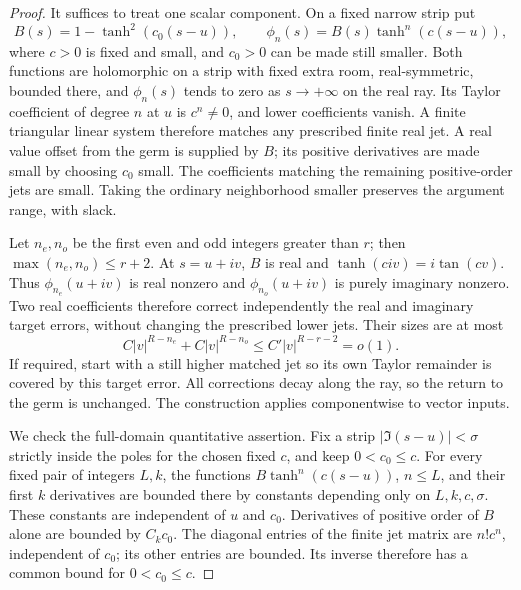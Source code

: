 \begin{proof}
It suffices to treat one scalar component.  On a fixed narrow strip put
\[
 B(s)=1-\tanh^2(c_0(s-u)),\qquad
 \phi_n(s)=B(s)\tanh^n(c(s-u)),
\]
where $c>0$ is fixed and small, and $c_0>0$ can be made still smaller.
Both functions are holomorphic on a strip with fixed extra room,
real-symmetric, bounded there, and $\phi_n(s)$ tends to zero as
$s\to+\infty$ on the real ray.  Its Taylor coefficient of degree $n$ at
$u$ is $c^n\ne0$, and lower coefficients vanish.  A finite triangular
linear system therefore matches any prescribed finite real jet.  A real
value offset from the germ is supplied by $B$; its positive derivatives
are made small by choosing $c_0$ small.  The coefficients matching the
remaining positive-order jets are small.  Taking the ordinary neighborhood
smaller preserves the argument range, with slack.

Let $n_e,n_o$ be the first even and odd integers greater than $r$; then
$\max(n_e,n_o)\le r+2$.  At $s=u+iv$, $B$ is real and
$\tanh(civ)=i\tan(cv)$.  Thus $\phi_{n_e}(u+iv)$ is real nonzero and
$\phi_{n_o}(u+iv)$ is purely imaginary nonzero.  Two real coefficients
therefore correct independently the real and imaginary target errors,
without changing the prescribed lower jets.  Their sizes are at most
\[
 C|v|^{R-n_e}+C|v|^{R-n_o}
 \le C'|v|^{R-r-2}=o(1).
\]
If required, start with a still higher matched jet so its own Taylor
remainder is covered by this target error.  All corrections decay along
the ray, so the return to the germ is unchanged.  The construction applies
componentwise to vector inputs.

We check the full-domain quantitative assertion.  Fix a strip
$|\Im(s-u)|<\sigma$ strictly inside the poles for the chosen fixed $c$,
and keep $0<c_0\le c$.  For every fixed pair of integers $L,k$, the
functions $B\tanh^n(c(s-u))$, $n\le L$, and their first $k$ derivatives
are bounded there by constants depending only on $L,k,c,\sigma$.
These constants are independent of $u$ and $c_0$.  Derivatives of positive
order of $B$ alone are bounded by $C_k c_0$.  The diagonal entries of the
finite jet matrix are $n!c^n$, independent of $c_0$; its other entries
are bounded.  Its inverse therefore has a common bound for
$0<c_0\le c$.


\end{proof}
